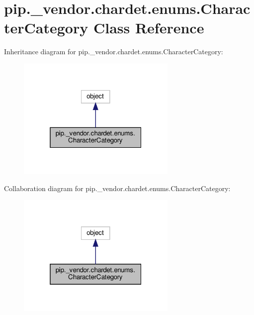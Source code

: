 \hypertarget{classpip_1_1__vendor_1_1chardet_1_1enums_1_1CharacterCategory}{}\section{pip.\+\_\+vendor.\+chardet.\+enums.\+Character\+Category Class Reference}
\label{classpip_1_1__vendor_1_1chardet_1_1enums_1_1CharacterCategory}


Inheritance diagram for pip.\+\_\+vendor.\+chardet.\+enums.\+Character\+Category\+:
\nopagebreak
\begin{figure}[H]
\begin{center}
\leavevmode
\includegraphics[width=217pt]{classpip_1_1__vendor_1_1chardet_1_1enums_1_1CharacterCategory__inherit__graph}
\end{center}
\end{figure}


Collaboration diagram for pip.\+\_\+vendor.\+chardet.\+enums.\+Character\+Category\+:
\nopagebreak
\begin{figure}[H]
\begin{center}
\leavevmode
\includegraphics[width=217pt]{classpip_1_1__vendor_1_1chardet_1_1enums_1_1CharacterCategory__coll__graph}
\end{center}
\end{figure}
